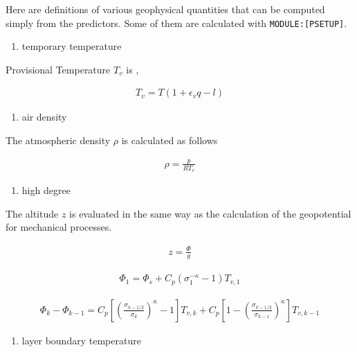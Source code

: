 Here are definitions of various geophysical quantities that can be
computed simply from the predictors. Some of them are calculated with
\texttt{MODULE:{[}PSETUP{]}}.

\begin{enumerate}
\def\labelenumi{\arabic{enumi}.}
\tightlist
\item
  temporary temperature
\end{enumerate}

Provisional Temperature \(T_v\) is ,

\begin{eqnarray}
  T_v = T ( 1 + \epsilon_v q - l )
\end{eqnarray}

\begin{enumerate}
\def\labelenumi{\arabic{enumi}.}
\setcounter{enumi}{1}
\tightlist
\item
  air density
\end{enumerate}

The atmospheric density \(\rho\) is calculated as follows

\begin{eqnarray}
  \rho = \frac{p}{RT_v}
\end{eqnarray}

\begin{enumerate}
\def\labelenumi{\arabic{enumi}.}
\setcounter{enumi}{2}
\tightlist
\item
  high degree
\end{enumerate}

The altitude \(z\) is evaluated in the same way as the calculation of
the geopotential for mechanical processes.

\begin{eqnarray}
  z = \frac{\Phi}{g}
\end{eqnarray}

\begin{eqnarray}
 \Phi_{1}  =  \Phi_{s} + C_{p} ( \sigma_{1}^{-\kappa} - 1  ) T_{v,1}
\end{eqnarray}

\begin{eqnarray}
 \Phi_k - \Phi_{k-1}
   =  C_{p}
   \left[ \left( \frac{ \sigma_{k-1/2} }{ \sigma_k } \right)^{\kappa}
          - 1 \right] T_{v,k}
       + C_{p}
   \left[ 1-
         \left( \frac{ \sigma_{k-1/2} }{ \sigma_{k-1} } \right)^{\kappa}
              \right] T_{v,k-1}
\end{eqnarray}

\begin{enumerate}
\def\labelenumi{\arabic{enumi}.}
\setcounter{enumi}{3}
\tightlist
\item
  layer boundary temperature
\end{enumerate}

